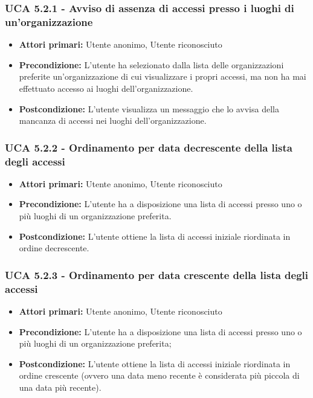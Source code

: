 \subsubsection{UCA 5.2.1 - Avviso di assenza di accessi presso i luoghi di un'organizzazione}
\begin{itemize}
    \item \textbf{Attori primari:} Utente anonimo, Utente riconosciuto
    \item \textbf{Precondizione:} L'utente ha selezionato dalla lista delle organizzazioni preferite un'organizzazione di cui visualizzare i propri accessi, ma non ha mai effettuato accesso ai luoghi dell'organizzazione.
    \item \textbf{Postcondizione:} L'utente visualizza un messaggio che lo avvisa della mancanza di accessi nei luoghi dell'organizzazione.
\end{itemize}

\subsubsection{UCA 5.2.2 - Ordinamento per data decrescente della lista degli accessi}
\begin{itemize}
    \item \textbf{Attori primari:} Utente anonimo, Utente riconosciuto
    \item \textbf{Precondizione:} L'utente ha a disposizione una lista di accessi presso uno o più luoghi di un organizzazione preferita.
    \item \textbf{Postcondizione:} L'utente ottiene la lista di accessi iniziale riordinata in ordine decrescente.
\end{itemize}

\subsubsection{UCA 5.2.3 - Ordinamento per data crescente della lista degli accessi}
\begin{itemize}
    \item \textbf{Attori primari:} Utente anonimo, Utente riconosciuto
    \item \textbf{Precondizione:} L'utente ha a disposizione una lista di accessi presso uno o più luoghi di un organizzazione preferita;
    \item \textbf{Postcondizione:} L'utente ottiene la lista di accessi iniziale riordinata in ordine crescente (ovvero una data meno recente è considerata più piccola di una data più recente).
\end{itemize}

